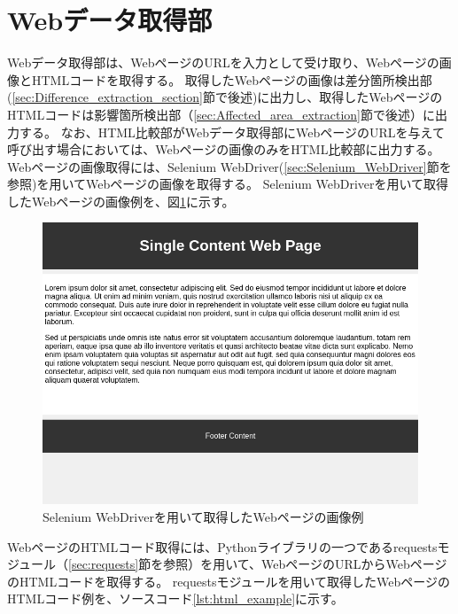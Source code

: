 \section{Webデータ取得部}\label{sec:Web_data_get_section}
Webデータ取得部は、WebページのURLを入力として受け取り、Webページの画像とHTMLコードを取得する。
取得したWebページの画像は差分箇所検出部(\ref{sec:Difference_extraction_section}節で後述)に出力し、取得したWebページのHTMLコードは影響箇所検出部（\ref{sec:Affected_area_extraction}節で後述）に出力する。
なお、HTML比較部がWebデータ取得部にWebページのURLを与えて呼び出す場合においては、Webページの画像のみをHTML比較部に出力する。
Webページの画像取得には、Selenium WebDriver(\ref{sec:Selenium_WebDriver}節を参照)を用いてWebページの画像を取得する。
Selenium WebDriverを用いて取得したWebページの画像例を、図\ref{fig:4_get_images}に示す。
\begin{figure}[tp]
    \begin{center}
        \includegraphics[width=1.0\columnwidth]{image/4_get_images.png}
        \caption{Selenium WebDriverを用いて取得したWebページの画像例}
        \label{fig:4_get_images}
    \end{center}
\end{figure}
WebページのHTMLコード取得には、Pythonライブラリの一つであるrequestsモジュール（\ref{sec:requests}節を参照）を用いて、WebページのURLからWebページのHTMLコードを取得する。
requestsモジュールを用いて取得したWebページのHTMLコード例を、ソースコード\ref{lst:html_example}に示す。
